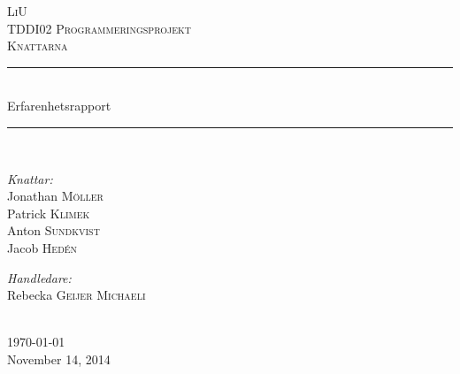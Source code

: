\documentclass{article}
\newcommand{\HRule}{\rule{\linewidth}{0.5mm}}
\begin{document}
\begin{titlepage}
\center

\textsc{\LARGE LiU}\\[1.5cm]
\textsc{\Large TDDI02 Programmeringsprojekt}\\[0.5cm]
\textsc{\large Knattarna}\\[0.5cm]

\HRule\\[0.4cm]
{\huge Erfarenhetsrapport}\\[0.4cm]
\HRule\\[1.4cm]

\begin{minipage}{0.4\textwidth}
\begin{flushleft} \large
\emph{Knattar:}\\
Jonathan \textsc{Möller}\\
Patrick \textsc{Klimek}\\
Anton \textsc{Sundkvist}\\
Jacob \textsc{Hedén}\\
\end{flushleft}
\end{minipage}
\begin{minipage}{0.4\textwidth}
\begin{flushright} \large
\emph{Handledare:} \\
Rebecka \textsc{Geijer Michaeli} %
\end{flushright}
\end{minipage}\\[4cm]





{\large \today}\\[0.3cm] %
{\large November 14, 2014}\\[3cm] %



\end{titlepage}


\end{document}
